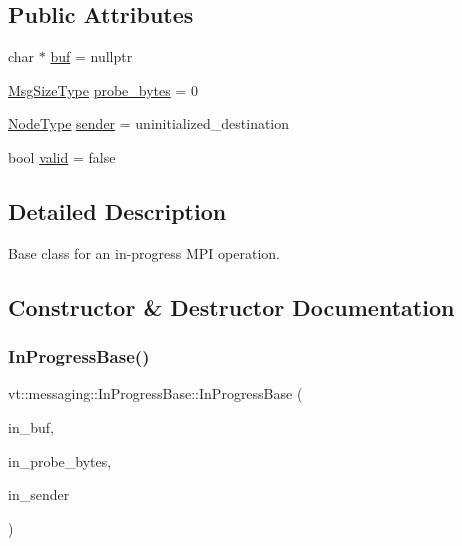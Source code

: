 \subsection*{Public Attributes}
\begin{DoxyCompactItemize}
\item 
char $\ast$ \hyperlink{structvt_1_1messaging_1_1_in_progress_base_a0ca5ccc2c8a35f0094893d6da21af4fd}{buf} = nullptr
\item 
\hyperlink{namespacevt_a408e86a8c7c89309b52907dc5a513924}{Msg\+Size\+Type} \hyperlink{structvt_1_1messaging_1_1_in_progress_base_a702edc025a2cd95e5a267d5acbda9f1d}{probe\+\_\+bytes} = 0
\item 
\hyperlink{namespacevt_a866da9d0efc19c0a1ce79e9e492f47e2}{Node\+Type} \hyperlink{structvt_1_1messaging_1_1_in_progress_base_ad0c153e52ba71c9295a45d73a5d3ccd8}{sender} = uninitialized\+\_\+destination
\item 
bool \hyperlink{structvt_1_1messaging_1_1_in_progress_base_a5dce1ae0bdfaa40935023561e0d16671}{valid} = false
\end{DoxyCompactItemize}


\subsection{Detailed Description}
Base class for an in-\/progress M\+PI operation. 

\subsection{Constructor \& Destructor Documentation}
\mbox{\label{structvt_1_1messaging_1_1_in_progress_base_a76a5651bf56a3ed12ea800aa5b16cf22}} 
\subsubsection{\texorpdfstring{In\+Progress\+Base()}{InProgressBase()}}
{\footnotesize\ttfamily vt\+::messaging\+::\+In\+Progress\+Base\+::\+In\+Progress\+Base (\begin{DoxyParamCaption}\item[{char $\ast$}]{in\+\_\+buf,  }\item[{\hyperlink{namespacevt_a408e86a8c7c89309b52907dc5a513924}{Msg\+Size\+Type}}]{in\+\_\+probe\+\_\+bytes,  }\item[{\hyperlink{namespacevt_a866da9d0efc19c0a1ce79e9e492f47e2}{Node\+Type}}]{in\+\_\+sender }\end{DoxyParamCaption})\hspace{0.3cm}{\ttfamily [inline]}}



